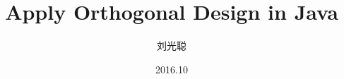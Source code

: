 \title[Orthogonal Design]
{Apply Orthogonal Design in Java}

\subtitle{}

\author[刘光聪]
{ 刘光聪
}

\institute[]
{
}

\date[2016.10]{2016.10}